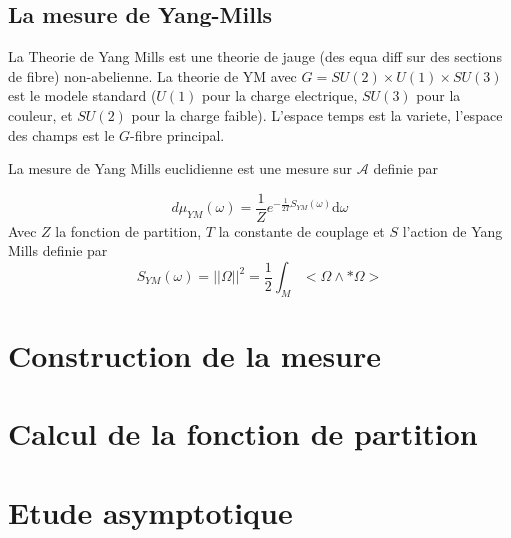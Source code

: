 \documentclass[a4paper]{report}
\theoremstyle{definition}
\theoremstyle{remark}
\begin{document}
\section{La mesure de Yang-Mills}
La Theorie de Yang Mills est une theorie de jauge (des equa diff sur des sections de fibre) non-abelienne. La theorie de YM avec $G = SU(2)\times U(1) \times SU(3)$ est le modele standard ($U(1)$ pour la charge electrique, $SU(3)$ pour la couleur, et $SU(2)$ pour la charge faible). L'espace temps est la variete, l'espace des champs est le $G$-fibre principal.\par \medskip 

La mesure de Yang Mills euclidienne est une mesure sur $\mathcal A$ definie par 

\begin{equation}
    d\mu _{YM} (\omega) = \frac{1}{Z} e^{-\frac{1}{2T} S_{YM}(\omega)} \text{d}\omega
\end{equation}
Avec $Z$ la fonction de partition, $T$ la constante de couplage et $S$ l'action de Yang Mills definie par  
\begin{equation}
    S_{YM}(\omega) = ||\Omega||^2 = \frac{1}{2} \int_M <\Omega \wedge *\Omega>
\end{equation}
\chapter{Construction de la mesure}

\chapter{Calcul de la fonction de partition}

\chapter{Etude asymptotique}
\end{document}
